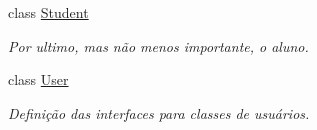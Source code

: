 \begin{DoxyCompactItemize}
class \hyperlink{classELO_1_1EntityUnit_1_1Student}{Student}
\begin{DoxyCompactList}\small\item\em Por ultimo, mas não menos importante, o aluno. \end{DoxyCompactList}\item 
class \hyperlink{classELO_1_1EntityUnit_1_1User}{User}
\begin{DoxyCompactList}\small\item\em Definição das interfaces para classes de usuários. \end{DoxyCompactList}\end{DoxyCompactItemize}
